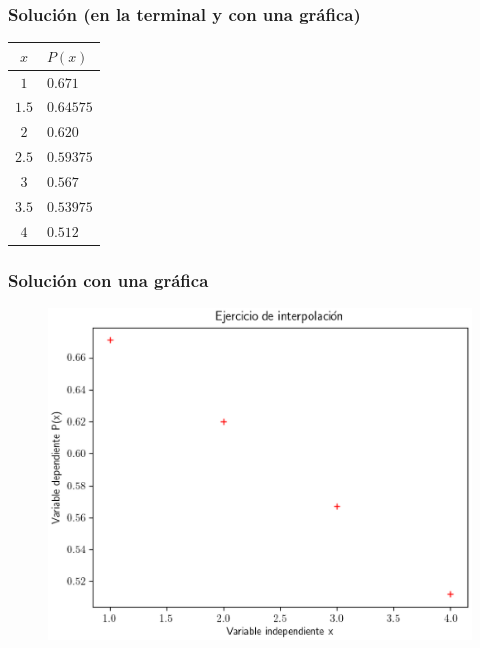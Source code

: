 \documentclass[12pt]{beamer}
\begin{document}
\begin{frame}[fragile]
\frametitle{Solución (en la terminal y con una gráfica)}
\begin{table}
\centering
\renewcommand{\arraystretch}{0.9}
\begin{tabular}{c | l}
$x$ & $P (x)$ \\
\hline $1$   & $0.671$ \\
\hline $1.5$ & $0.64575$ \\
\hline $2$   & $0.620$ \\
\hline $2.5$ & $0.59375$ \\
\hline $3$   & $0.567$ \\
\hline $3.5$ & $0.53975$ \\
\hline $4$   & $0.512$
\end{tabular}
\end{table}
\end{frame}
\begin{frame}
\frametitle{Solución con una gráfica}
\begin{figure}
	\centering
	\includegraphics[scale=0.58]{Imagenes/Ejercicio_Interpolacion_01.eps}
\end{figure}
\end{frame}
\end{document}
